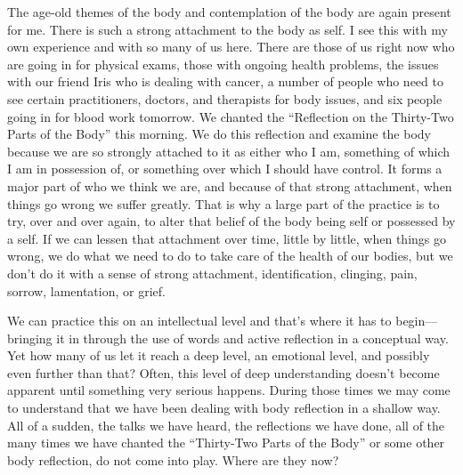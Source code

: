 The age-old themes of the body and contemplation of the body are again 
present for me. There is such a strong attachment to the body as self. 
I see this with my own experience and with so many of us here. There 
are those of us right now who are going in for physical exams, those 
with ongoing health problems, the issues with our friend Iris who is 
dealing with cancer, a number of people who need to see certain 
practitioners, doctors, and therapists for body issues, and six people 
going in for blood work tomorrow. We chanted the ``Reflection on the 
Thirty-Two Parts of the Body'' this morning. We do this reflection and 
examine the body because we are so strongly attached to it as either 
who I am, something of which I am in possession of, or something over 
which I should have control. It forms a major part of who we think we 
are, and because of that strong attachment, when things go wrong we 
suffer greatly. That is why a large part of the practice is to try, 
over and over again, to alter that belief of the body being self or 
possessed by a self. If we can lessen that attachment over time, little 
by little, when things go wrong, we do what we need to do to take care 
of the health of our bodies, but we don't do it with a sense of strong 
attachment, identification, clinging, pain, sorrow, lamentation, or 
grief.

We can practice this on an intellectual level and that's where it has 
to begin---bringing it in through the use of words and active 
reflection in a conceptual way. Yet how many of us let it reach a deep 
level, an emotional level, and possibly even further than that? Often, 
this level of deep understanding doesn't become apparent until 
something very serious happens. During those times we may come to 
understand that we have been dealing with body reflection in a shallow 
way. All of a sudden, the talks we have heard, the reflections we have 
done, all of the many times we have chanted the ``Thirty-Two Parts of 
the Body'' or some other body reflection, do not come into play. Where 
are they now?

